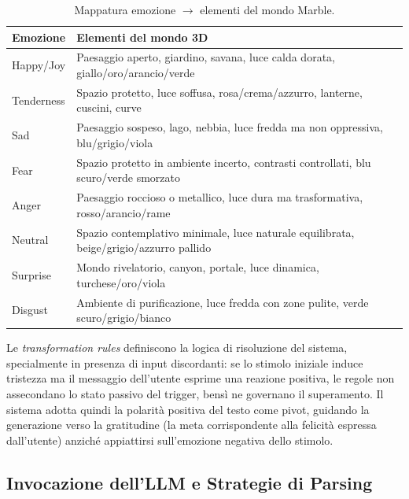 \documentclass[11pt]{report}
\begin{document}
\begin{table}[H]
    \centering
    \caption{Mappatura emozione $\rightarrow$ elementi del mondo Marble.}
    \label{tab:emotion_world}
    \footnotesize
    \begin{tabularx}{\textwidth}{l X}
        \toprule
        \textbf{Emozione} & \textbf{Elementi del mondo 3D} \\
        \midrule
        Happy/Joy & Paesaggio aperto, giardino, savana, luce calda dorata, giallo/oro/arancio/verde \\
        Tenderness & Spazio protetto, luce soffusa, rosa/crema/azzurro, lanterne, cuscini, curve \\
        Sad & Paesaggio sospeso, lago, nebbia, luce fredda ma non oppressiva, blu/grigio/viola \\
        Fear & Spazio protetto in ambiente incerto, contrasti controllati, blu scuro/verde smorzato \\
        Anger & Paesaggio roccioso o metallico, luce dura ma trasformativa, rosso/arancio/rame \\
        Neutral & Spazio contemplativo minimale, luce naturale equilibrata, beige/grigio/azzurro pallido \\
        Surprise & Mondo rivelatorio, canyon, portale, luce dinamica, turchese/oro/viola \\
        Disgust & Ambiente di purificazione, luce fredda con zone pulite, verde scuro/grigio/bianco \\
        \bottomrule
    \end{tabularx}
\end{table}
 
Le \textit{transformation rules} definiscono la logica di risoluzione del sistema, specialmente in presenza di input discordanti: se lo stimolo iniziale induce tristezza ma il messaggio dell'utente esprime una reazione positiva, le regole non assecondano lo stato passivo del trigger, bensì ne governano il superamento. Il sistema adotta quindi la polarità positiva del testo come pivot, guidando la generazione verso la gratitudine (la meta corrispondente alla felicità espressa dall'utente) anziché appiattirsi sull'emozione negativa dello stimolo.
 
\subsection{Invocazione dell'LLM e Strategie di Parsing}
\end{document}
